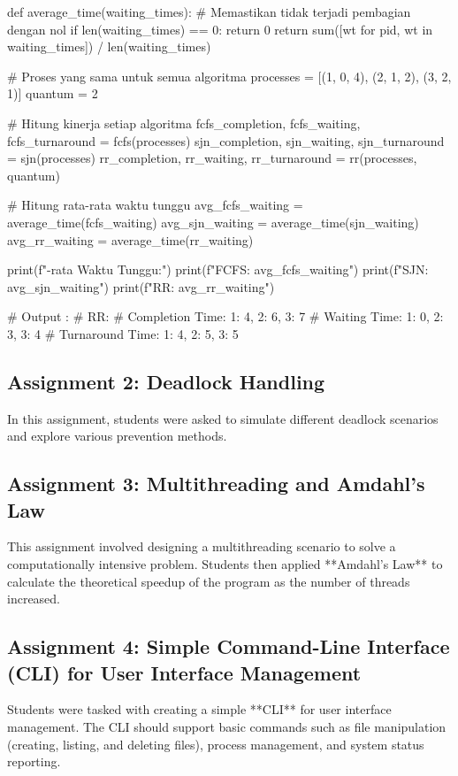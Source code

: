 \documentclass[12pt]{article}
\begin{document}
\begin{enumerate}
\begin{python}
def average_time(waiting_times):
    # Memastikan tidak terjadi pembagian dengan nol
    if len(waiting_times) == 0:
        return 0
    return sum([wt for pid, wt in waiting_times]) / len(waiting_times)

# Proses yang sama untuk semua algoritma
processes = [(1, 0, 4), (2, 1, 2), (3, 2, 1)]
quantum = 2

# Hitung kinerja setiap algoritma
fcfs_completion, fcfs_waiting, fcfs_turnaround = fcfs(processes)
sjn_completion, sjn_waiting, sjn_turnaround = sjn(processes)
rr_completion, rr_waiting, rr_turnaround = rr(processes, quantum)

# Hitung rata-rata waktu tunggu
avg_fcfs_waiting = average_time(fcfs_waiting)
avg_sjn_waiting = average_time(sjn_waiting)
avg_rr_waiting = average_time(rr_waiting)

print(f"\nRata-rata Waktu Tunggu:")
print(f"FCFS: {avg_fcfs_waiting}")
print(f"SJN: {avg_sjn_waiting}")
print(f"RR: {avg_rr_waiting}")

# Output : 
# RR:
# Completion Time: {1: 4, 2: 6, 3: 7}
# Waiting Time: {1: 0, 2: 3, 3: 4}
# Turnaround Time: {1: 4, 2: 5, 3: 5}
\end{python}
\end{enumerate}

\subsection{Assignment 2: Deadlock Handling}
In this assignment, students were asked to simulate different deadlock scenarios and explore various prevention methods.

\subsection{Assignment 3: Multithreading and Amdahl's Law}
This assignment involved designing a multithreading scenario to solve a computationally intensive problem. Students then applied **Amdahl's Law** to calculate the theoretical speedup of the program as the number of threads increased.

\subsection{Assignment 4: Simple Command-Line Interface (CLI) for User Interface Management}
Students were tasked with creating a simple **CLI** for user interface management. The CLI should support basic commands such as file manipulation (creating, listing, and deleting files), process management, and system status reporting.
\end{document}
